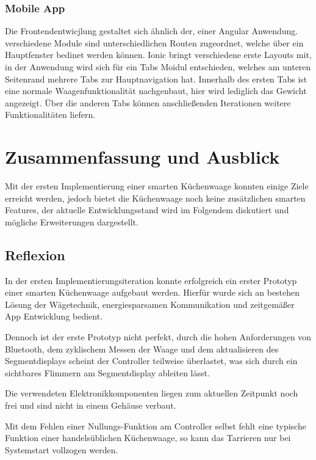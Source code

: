 \subsubsection{Mobile App}

Die Frontendentwicjlung gestaltet sich ähnlich der, einer Angular Anwendung. verschiedene Module sind unterschiedlichen Routen zugeordnet, welche über ein Hauptfenster bedinet werden können. Ionic bringt verschiedene erste Layouts mit, in der Anwendung wird sich für ein Tabs Moidul entschieden, welches am unteren Seitenrand mehrere Tabs zur Hauptnavigation hat. Innerhalb des ersten Tabs ist eine normale Waagenfunktionalität nachgenbaut, hier wird lediglich das Gewicht angezeigt. Über die anderen Tabs können anschließenden Iterationen weitere Funktionalitäten liefern. 

\section{Zusammenfassung und Ausblick \label{Kap.:Zusammenfassung}}

Mit der ersten Implementierung einer smarten Küchenwaage konnten einige Ziele erreicht werden, jedoch bietet die Küchenwaage noch keine zusätzlichen smarten Features, der aktuelle Entwicklungsstand wird im Folgendem diskutiert und mögliche Erweiterungen dargestellt.


\subsection{Reflexion}%

In der ersten Implementierungsiteration konnte erfolgreich ein erster Prototyp einer smarten Küchenwaage aufgebaut werden. Hierfür wurde sich an bestehen Lösung der Wägetechnik, energiesparsamen Kommunikation und zeitgemäßer App Entwicklung bedient. 

Dennoch ist der erste Prototyp nicht perfekt, durch die hohen Anforderungen von Bluetooth, dem zyklischem Messen der Waage und dem aktualisieren des Segmentdisplays scheint der Controller teilweise überlastet, was sich durch ein sichtbares Flimmern am Segmentdisplay ableiten lässt. 

Die verwendeten Elektronikkomponenten liegen zum aktuellen Zeitpunkt noch frei und sind nicht in einem Gehäuse verbaut. 

Mit dem Fehlen einer Nullungs-Funktion am Controller selbst fehlt eine typische Funktion einer handelsüblichen Küchenwaage, so kann das Tarrieren nur bei Systemstart vollzogen werden. 

